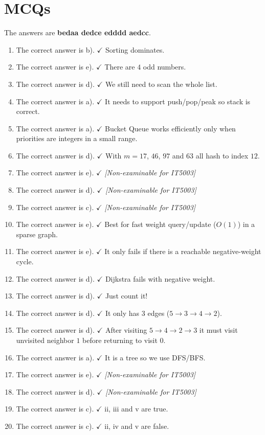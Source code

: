\documentclass[12pt]{article}
\begin{document}
\section{MCQs}
The answers are \textbf{bedaa dedce edddd aedcc}.
\begin{enumerate}
\item The correct answer is b). $\checkmark$ Sorting dominates.
\item The correct answer is e). $\checkmark$ There are $4$ odd numbers.
\item The correct answer is d). $\checkmark$ We still need to scan the whole list.
\item The correct answer is a). $\checkmark$ It needs to support push/pop/peak so stack is correct.
\item The correct answer is a). $\checkmark$ Bucket Queue works efficiently only when priorities are integers in a small range.
\item The correct answer is d). $\checkmark$ With $m=17$, $46$, $97$ and $63$ all hash to index $12$.
\item The correct answer is e). $\checkmark$ \textit{[Non-examinable for IT5003]}
\item The correct answer is d). $\checkmark$ \textit{[Non-examinable for IT5003]}
\item The correct answer is c). $\checkmark$ \textit{[Non-examinable for IT5003]}
\item The correct answer is e). $\checkmark$ Best for fast weight query/update ($O(1)$) in a sparse graph.
\item The correct answer is e). $\checkmark$ It only fails if there is a reachable negative-weight cycle.
\item The correct answer is d). $\checkmark$ Dijkstra fails with negative weight.
\item The correct answer is d). $\checkmark$ Just count it!
\item The correct answer is d). $\checkmark$ It only has $3$ edges ($5\to3\to4\to2$).
\item The correct answer is d). $\checkmark$ After visiting $5\to4\to2\to3$ it must visit unvisited neighbor $1$ before returning to visit $0$.
\item The correct answer is a). $\checkmark$ It is a tree so we use DFS/BFS.
\item The correct answer is e). $\checkmark$ \textit{[Non-examinable for IT5003]}
\item The correct answer is d). $\checkmark$ \textit{[Non-examinable for IT5003]}
\item The correct answer is c). $\checkmark$ ii, iii and v are true.
\item The correct answer is c). $\checkmark$ ii, iv and v are false.
\end{enumerate}
\end{document}
